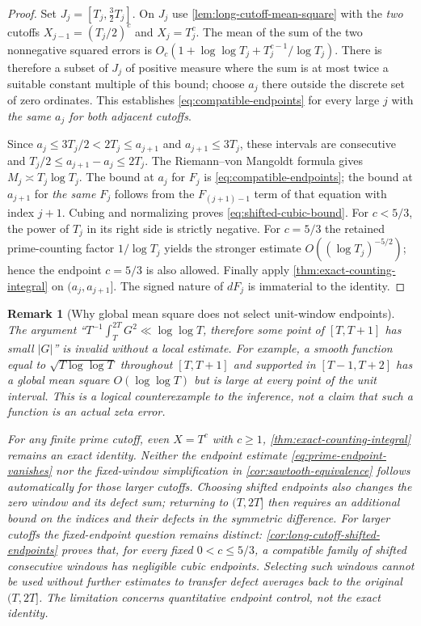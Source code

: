 \documentclass[11pt,reqno]{amsart}
\numberwithin{equation}{section}
\newtheorem{remark}[theorem]{Remark}
\begin{document}
\begin{proof}
Set $J_j=[T_j,\tfrac32T_j]$. On $J_j$ use
\cref{lem:long-cutoff-mean-square} with the \emph{two}
cutoffs $X_{j-1}=(T_j/2)^c$ and $X_j=T_j^c$.
The mean of the sum of the two nonnegative squared errors
is $O_c(1+\log\log T_j+T_j^{c-1}/\log T_j)$.
There is therefore a subset of $J_j$ of positive measure
where the sum is at most twice a suitable constant multiple
of this bound; choose $a_j$ there outside the discrete set
of zero ordinates. This establishes
\eqref{eq:compatible-endpoints} for every large $j$ with
\emph{the same $a_j$ for both adjacent cutoffs}.

Since $a_j\le3T_j/2<2T_j\le a_{j+1}$ and
$a_{j+1}\le3T_j$, these intervals are consecutive and
$T_j/2\le a_{j+1}-a_j\le2T_j$. The Riemann--von
Mangoldt formula gives $M_j\asymp T_j\log T_j$.
The bound at $a_j$ for $F_j$ is
\eqref{eq:compatible-endpoints}; the bound at $a_{j+1}$
for \emph{the same $F_j$} follows from the $F_{(j+1)-1}$
term of that equation with index $j+1$. Cubing and
normalizing proves \eqref{eq:shifted-cubic-bound}.
For $c<5/3$, the power of $T_j$ in its right side is
strictly negative. For $c=5/3$ the retained prime-counting
factor $1/\log T_j$ yields the stronger estimate
$O((\log T_j)^{-5/2})$; hence the endpoint $c=5/3$
is also allowed. Finally apply
\cref{thm:exact-counting-integral} on $(a_j,a_{j+1}]$.
The signed nature of $dF_j$ is immaterial to the identity.
\end{proof}

\begin{remark}[Why global mean square does not select unit-window endpoints]
\label{rem:no-unit-endpoint-selection}
The argument ``$T^{-1}\int_T^{2T}G^2\ll\log\log T$,
therefore some point of $[T,T+1]$ has small $|G|$'' is
\emph{invalid without a local estimate}.  For example, a smooth
function equal to $\sqrt{T\log\log T}$ throughout
$[T,T+1]$ and supported in $[T-1,T+2]$ has a global mean
square $O(\log\log T)$ but is large at every point of the unit
interval.  This is a logical counterexample to the inference,
not a claim that such a function is an actual zeta error.

For any \emph{finite} prime cutoff, even $X=T^c$ with $c\ge1$,
\cref{thm:exact-counting-integral} remains an exact identity.
Neither the endpoint estimate \eqref{eq:prime-endpoint-vanishes}
nor the fixed-window simplification in
\cref{cor:sawtooth-equivalence} follows automatically for those
larger cutoffs.  Choosing shifted endpoints also changes the zero
window and its defect sum; returning to $(T,2T]$ then requires
an additional bound on the indices and their defects in the
symmetric difference.  For larger cutoffs the \emph{fixed-endpoint} question
remains distinct: \cref{cor:long-cutoff-shifted-endpoints} proves
that, for every fixed $0<c\le5/3$, a compatible family of
\emph{shifted consecutive windows} has negligible cubic endpoints.
Selecting such windows cannot be used without further estimates
to transfer defect averages back to the original $(T,2T]$.
The limitation concerns quantitative endpoint control, not
the exact identity.
\end{remark}
\end{document}
